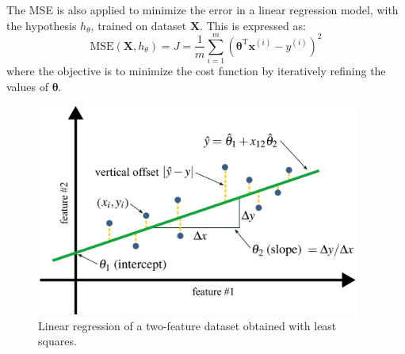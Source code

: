 \documentclass[12pt,letter]{article}
\begin{document}
The MSE is also applied to minimize the error in a linear regression model, with the hypothesis $h_\theta$, trained on dataset $\textbf{X}$. This is expressed as:
\begin{equation}
\text{MSE}(\textbf{X},h_\theta) = J = \frac{1}{m} \sum_{i=1}^{m} (\pmb{\theta}^\text{T}\textbf{x}^{(i)}-y^{(i)})^2
\end{equation}
\noindent where the objective is to minimize the cost function by iteratively refining the values of $\pmb{\theta}$.

\begin{figure}[H]
    \centering
    \includegraphics[width=4.2in]{../figures/least_squares}
    \caption{Linear regression of a two-feature dataset obtained with least squares.}
    \label{fig:least_squares}
\end{figure}

\end{document}

